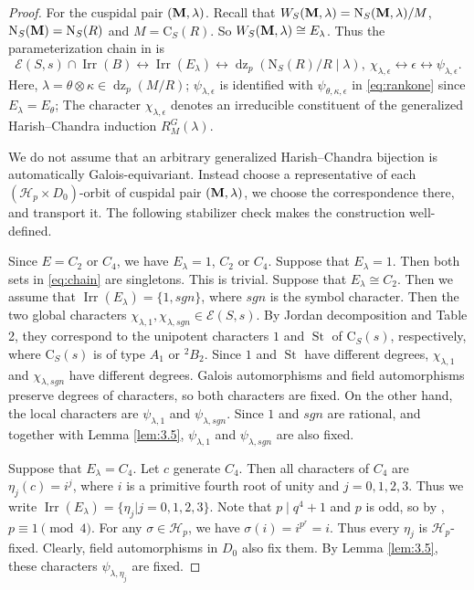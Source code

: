 \documentclass[11pt,a4paper]{article}
\numberwithin{equation}{section}
\theoremstyle{definition}
\theoremstyle{remark}
\newcommand{\Irr}{\operatorname{Irr}}
\DeclareMathOperator{\St}{St}
\newcommand{\dz}{\operatorname{dz}}
\newcommand{\HH}{\mathcal H}
\newcommand{\NN}{\mathrm N}
\newcommand{\CC}{\mathrm C}
\begin{document}
\begin{proof}
For the cuspidal pair $({\bf M},\lambda)$. Recall that $W_S({\bf M},\lambda)=\NN_{S}({\bf M},\lambda)/M$, $\NN_{S}({\bf M})=\NN_S(R)$ and $M=\CC_S(R)$. So $W_S({\bf M},\lambda)\cong E_\lambda$. Thus the parameterization chain in \cite[Propositions~3.5--3.6 and Corollary~3.7]{Malle} is
\begin{equation}\label{eq:chain}
\mathcal{E}(S,s)\cap\Irr(B)\longleftrightarrow\Irr(E_\lambda)
 \longleftrightarrow\dz_p(\NN_S(R)/R\mid\lambda),\ 
\chi_{\lambda, \epsilon}\leftrightarrow \epsilon\leftrightarrow \psi_{\lambda,\epsilon}.
\end{equation}
Here, $\lambda=\theta\otimes\kappa\in\dz_p(M/R)$; $\psi_{\lambda,\epsilon}$ is identified with $\psi_{\theta,\kappa,\epsilon}$ in \eqref{eq:rankone} since $E_\lambda=E_\theta$; The character $\chi_{\lambda,\epsilon}$ denotes an irreducible constituent of the generalized Harish–Chandra induction $R_M^G(\lambda)$.



We do not assume that an arbitrary generalized Harish--Chandra bijection is automatically Galois-equivariant. Instead choose a representative of each $(\HH_p\times D_0)$-orbit of cuspidal pair $({\bf M},\lambda)$, we choose the correspondence there, and transport it. The following stabilizer check makes the construction well-defined. 

Since $E=C_2$ or $C_4$, we have $E_\lambda=1$, $C_2$ or $C_4$. Suppose that $E_\lambda=1$. Then both sets in \eqref{eq:chain} are singletons. This is trivial.  
Suppose that $E_\lambda\cong C_2$. Then
we assume that $\Irr(E_\lambda)=\{1,sgn\}$, where 
$sgn$ is the symbol character. 
Then the two global characters $\chi_{\lambda,1}, \chi_{\lambda,sgn}\in\mathcal{E}(S,s)$. By Jordan decomposition and Table 2, they correspond to the unipotent characters $1$ and $\St$ of $\CC_S(s)$, respectively, where $\CC_S(s)$ is of type $A_1$ or ${}^2B_2$.
Since $1$ and $\St$ have  different degrees, $\chi_{\lambda,1}$ and $\chi_{\lambda,sgn}$ have different degrees. Galois automorphisms and field automorphisms preserve  degrees of characters, so both characters are fixed.   On the other hand, the local characters are $\psi_{\lambda, 1}$ and $\psi_{\lambda,sgn}$. Since  $1$ and $sgn$ are rational, and together with Lemma \ref{lem:3.5}, $\psi_{\lambda, 1}$ and $\psi_{\lambda,sgn}$ are also fixed. 

Suppose that $E_\lambda=C_4$. Let $c$ generate $C_4$.
Then all characters of $C_4$ are $\eta_j(c)=i^j$,
where $i$ is a primitive fourth root of unity and 
$j=0,1,2,3$. Thus we write
$\Irr(E_\lambda)=\{\eta_j|j=0,1,2,3\}$.
Note that \(p\mid q^4+1\) and \(p\) is odd, so by \cite[Lemma 3.1(d)]{Johansson}, $p\equiv 1\pmod 4$.  For any \(\sigma\in\HH_p\), we have $\sigma(i)=i^{p^r}=i$. Thus every $\eta_j$ is \(\HH_p\)-fixed. Clearly, field automorphisms in $D_0$ also fix them. By Lemma \ref{lem:3.5}, these characters $\psi_{\lambda,\eta_j}$ are fixed. 
	

\end{proof}
\end{document}
